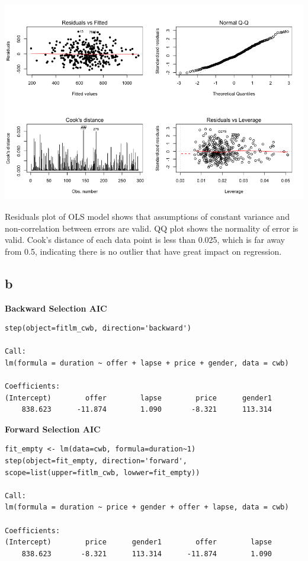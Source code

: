 \documentclass[11pt,letterpaper]{article}
\begin{document}
\includegraphics[scale=0.55]{4-a-1.png}

\noindent Residuals plot of OLS model shows that assumptions of constant variance and non-correlation between errors are valid. QQ plot shows the normality of error is valid. Cook's distance of each data point is less than 0.025, which is far away from 0.5, indicating there is no outlier that have great impact on regression. 

\subsection*{b}
\noindent \textbf{Backward Selection AIC}
\begin{verbatim}
step(object=fitlm_cwb, direction='backward')

Call:
lm(formula = duration ~ offer + lapse + price + gender, data = cwb)

Coefficients:
(Intercept)        offer        lapse        price      gender1  
    838.623      -11.874        1.090       -8.321      113.314  
\end{verbatim}

\noindent \textbf{Forward Selection AIC}
\begin{verbatim}
fit_empty <- lm(data=cwb, formula=duration~1)
step(object=fit_empty, direction='forward', scope=list(upper=fitlm_cwb, lowwer=fit_empty))

Call:
lm(formula = duration ~ price + gender + offer + lapse, data = cwb)

Coefficients:
(Intercept)        price      gender1        offer        lapse  
    838.623       -8.321      113.314      -11.874        1.090  
\end{verbatim}
\end{document}

